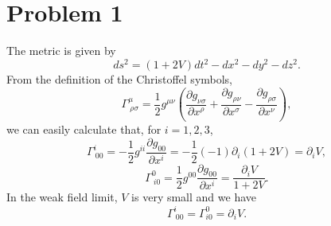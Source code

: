 \documentclass{article}
\begin{document}
\section*{Problem 1}
The metric is given by 
\begin{equation}
    ds^2 = (1 + 2V) dt^2 - dx^2 - dy^2 - dz^2.
\end{equation}
From the definition of the Christoffel symbols,
\begin{equation}
    \Gamma^\mu_{~\rho\sigma} = \frac{1}{2}g^{\mu \nu} 
    \left(
    \frac{\partial g_{\nu \sigma}}{\partial x^\rho} 
    + \frac{\partial g_{\rho \nu}}{\partial x^\sigma} 
    - \frac{\partial g_{\rho \sigma}}{\partial x^\nu}
    \right),
\end{equation}
we can easily calculate that, for $i=1,2,3$,
\begin{equation}
    \Gamma^i_{~00} = -\frac{1}{2} g^{ii} \frac{\partial g_{00}}{\partial x^i}
    =-\frac{1}{2}(-1)\partial_i(1+2V)
    =\partial_i V,
\end{equation}
\begin{equation}
    \Gamma^0_{~i0} = \frac{1}{2} g^{00} \frac{\partial g_{00}}{\partial x^i}
    =\frac{\partial_i V}{1+2V}.
\end{equation}
In the weak field limit, $V$ is very small and we have
\begin{equation}
    \Gamma^i_{~00} = \Gamma^0_{i0} = \partial_iV.
\end{equation}
\end{document}
